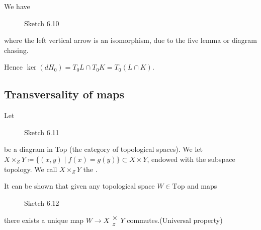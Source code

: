 \begin{remark}
    We have 
    \begin{figure}[H]\label{fig:6.10}
        \centering
        \caption{Sketch 6.10}
    \end{figure}
    where the left vertical arrow is an isomorphism, due to the five lemma or diagram chasing.

    Hence \(\ker (dH_0)=T_0L\cap T_0K=T_0(L\cap K)\).
\end{remark}

\subsection{Transversality of maps}

\begin{definition*} %
    Let \begin{figure}[H]\label{fig:6.11}
        \centering
        \caption{Sketch 6.11}
    \end{figure}
    be a diagram in Top (the category of topological spaces). We let \(X\times_Z Y \coloneqq \{(x,y)\mid f(x)=g(y)\}\subset X\times Y\),
    endowed with the subspace topology. We call \(X\times_Z Y\) the .
\end{definition*}

\begin{remark}
It can be shown that given any topological space \(W\in \text{Top}\) and maps 
\begin{center}
\end{center}
\begin{figure}[H]\label{fig:6.12}
    \centering
    
    \caption{Sketch 6.12}
\end{figure}

there exists a unique map \(W\to X\substack{\times\\ z} Y\) commutes.(Universal property)
\end{remark}

